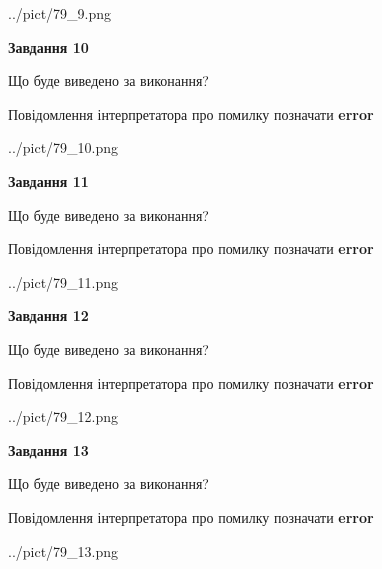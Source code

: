 \documentclass[11pt, ukrainian]{article}
\begin{document}
{\begin {large}
\begin{center}
	{../pict/79_9.png}
\end{center}
\newpage

{\begin {center}\textbf{Завдання 10}\end {center}}\par
Що буде виведено за виконання? \par
Повідомлення інтерпретатора про помилку позначати \textbf{error}

\begin{center}
	{../pict/79_10.png}
\end{center}
\newpage

{\begin {center}\textbf{Завдання 11}\end {center}}\par
Що буде виведено за виконання? \par
Повідомлення інтерпретатора про помилку позначати \textbf{error}

\begin{center}
	{../pict/79_11.png}
\end{center}
\newpage

{\begin {center}\textbf{Завдання 12}\end {center}}\par
Що буде виведено за виконання? \par
Повідомлення інтерпретатора про помилку позначати \textbf{error}

\begin{center}
	{../pict/79_12.png}
\end{center}
\newpage

{\begin {center}\textbf{Завдання 13}\end {center}}\par
Що буде виведено за виконання? \par
Повідомлення інтерпретатора про помилку позначати \textbf{error}

\begin{center}
	{../pict/79_13.png}
\end{center}
\newpage


\end{large}}
\end{document}
